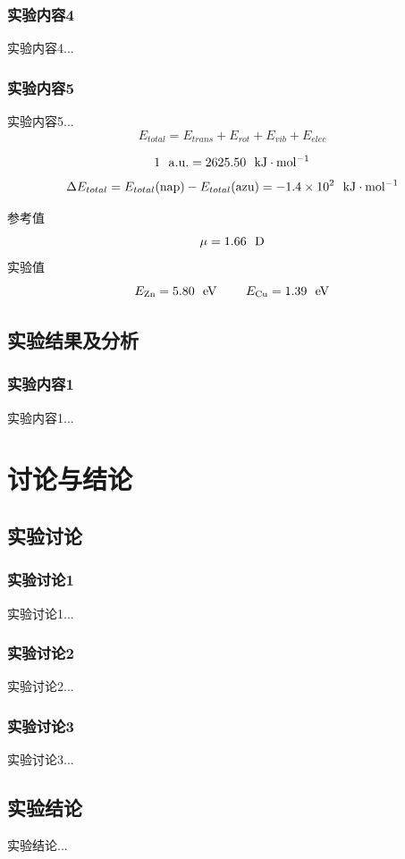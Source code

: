\documentclass[12pt]{article}
\begin{document}
		\subsubsection{实验内容4}
		实验内容4...
		\subsubsection{实验内容5}
		实验内容5...
 		$$ E_{total}=E_{trans}+E_{rot}+E_{vib}+E_{elec} $$ 
 	
 		$$ 1\ \ {\rm a.u.}=2625.50 \ \ {\rm kJ \cdot mol^{-1}} $$
 		$$\Delta E_{total}=E_{total}({\rm nap})-E_{total}{\rm (azu)=-1.4\times10^{2} \ \ kJ \cdot mol^{-1} }$$
 	
 		参考值\citealp{dean1992lange} 
 		$$\mu=1.66\ \ {\rm D}$$
 		实验值\citealp{Bast2009,Konecny2019}
 		$$E_{\rm Zn}=5.80 \ \ {\rm eV}\ \ \ \ \ \ \ E_{\rm Cu}=1.39\ \ {\rm eV}$$
 		
 		
 		\subsection{实验结果及分析}
 		\subsubsection{实验内容1}
 		实验内容1...
 		
 		

 	
	\vbox{}  	
 	\section{讨论与结论}
		\subsection{实验讨论}
 		\subsubsection{实验讨论1}
 	 	实验讨论1...
 	 	\subsubsection{实验讨论2}
 	 	实验讨论2...
 	 	\subsubsection{实验讨论3}
 		实验讨论3...
 	 
 	 	\subsection{实验结论}
 	 	实验结论...

	\vbox{}  

	
	
\end{document}

